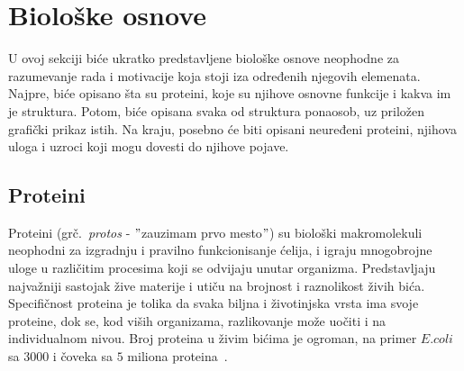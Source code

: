 \chapter{Biološke osnove} %
\label{bioloskeosnove} %

U ovoj sekciji biće ukratko predstavljene biološke osnove neophodne za razumevanje rada i motivacije koja stoji iza određenih njegovih elemenata.
Najpre, biće opisano šta su proteini, koje su njihove osnovne funkcije i kakva im je struktura. Potom, biće opisana svaka od struktura ponaosob, uz priložen grafički prikaz istih. Na kraju, posebno će biti opisani neuređeni proteini, njihova uloga i uzroci koji mogu dovesti do njihove pojave. 

\section{Proteini}
\label{sec:proteini}

Proteini (grč.~{\em protos} - $"$zauzimam prvo mesto$"$) su biološki makromolekuli neophodni za izgradnju i pravilno funkcionisanje ćelija, i igraju mnogobrojne uloge u različitim procesima koji se odvijaju unutar organizma. Predstavljaju najvažniji sastojak žive materije i utiču na brojnost i raznolikost živih bića. Specifičnost proteina je tolika da svaka biljna i životinjska vrsta ima svoje proteine, dok se, kod viših organizama, razlikovanje može uočiti i na individualnom nivou. Broj proteina u živim bićima je ogroman, na primer $E. coli$ sa $3000$ i čoveka sa $5$ miliona proteina~\cite{spasic}.\\

